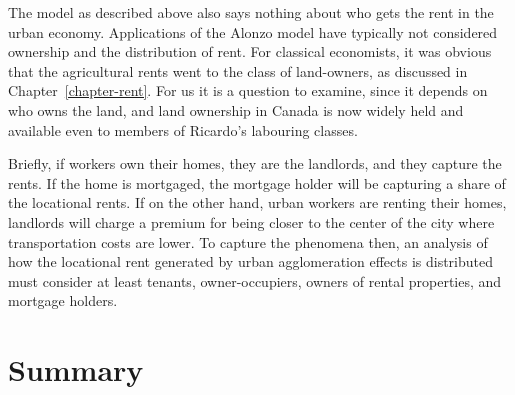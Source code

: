 The model as described above also says nothing about who gets the rent in the urban economy. Applications of the \Gls{Alonzo model} have typically not considered ownership and the distribution of rent. For classical economists, it was obvious that the agricultural rents went to the class of land-owners, as discussed in Chapter~\ref{chapter-rent}. 
For us it is a question to examine, since it depends on who owns the land, and land ownership in Canada is now widely held and available even to members of Ricardo's labouring classes.
 
Briefly, if workers own their homes, they are the landlords, and they capture the rents. If the home is mortgaged, the mortgage holder will be capturing a share of the locational rents. If on the other hand, urban workers are renting their homes, landlords will charge a premium for being closer to the center of the city where transportation costs are lower. To capture the phenomena then, an analysis of how the locational rent generated by urban agglomeration effects is distributed must consider at least tenants, owner-occupiers, owners of rental properties, and mortgage holders. 


\section{Summary}



